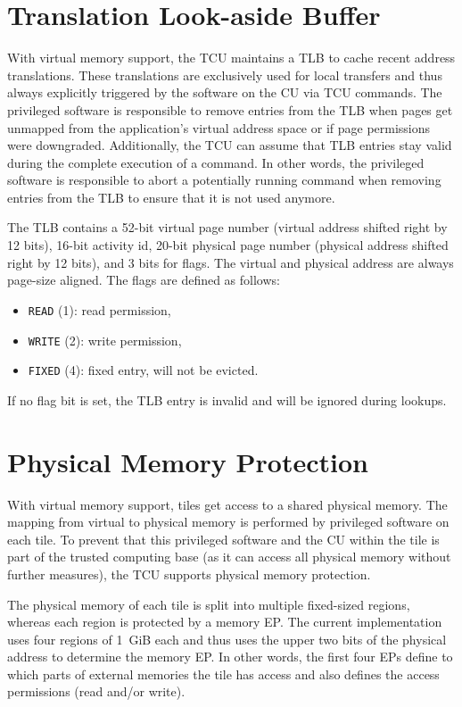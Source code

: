 \section{Translation Look-aside Buffer}
\label{sec:tlb}

With virtual memory support, the TCU maintains a TLB to cache recent address translations. These
translations are exclusively used for local transfers and thus always explicitly triggered by the
software on the CU via TCU commands. The privileged software is responsible to remove entries from
the TLB when pages get unmapped from the application's virtual address space or if page permissions
were downgraded. Additionally, the TCU can assume that TLB entries stay valid during the complete
execution of a command. In other words, the privileged software is responsible to abort a
potentially running command when removing entries from the TLB to ensure that it is not used
anymore.

The TLB contains a 52-bit virtual page number (virtual address shifted right by 12 bits),
\colorbox{tilemux}{16-bit activity id, }20-bit physical page number (physical address shifted right
by 12 bits), and 3 bits for flags. The virtual and physical address are always page-size aligned.
The flags are defined as follows:

\begin{itemize}
  \item \texttt{READ} (1): read permission,
  \item \texttt{WRITE} (2): write permission,
  \item \texttt{FIXED} (4): fixed entry, will not be evicted.
\end{itemize}

If no flag bit is set, the TLB entry is invalid and will be ignored during lookups.

\section{Physical Memory Protection}

\noindent With virtual memory support, tiles get access to a shared physical memory. The mapping from
virtual to physical memory is performed by privileged software on each tile. To prevent that this
privileged software and the CU within the tile is part of the trusted computing base (as it can access
all physical memory without further measures), the TCU supports physical memory protection.

The physical memory of each tile is split into multiple fixed-sized regions, whereas each region is
protected by a memory EP. The current implementation uses four regions of 1~GiB each and thus uses
the upper two bits of the physical address to determine the memory EP. In other words, the first
four EPs define to which parts of external memories the tile has access and also defines the access
permissions (read and/or write).


